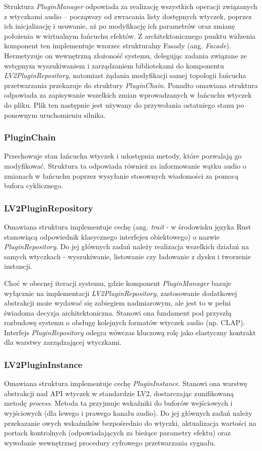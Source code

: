 \documentclass[12pt,a4paper]{report}
\begin{document}
Struktura \textit{PluginManager} odpowiada za realizację wszystkich
operacji związanych z wtyczkami audio – począwszy od zwracania listy
dostępnych wtyczek, poprzez ich inicjalizację i usuwanie, aż po
modyfikację ich parametrów oraz zmianę położenia w wirtualnym
łańcuchu efektów. Z architektonicznego punktu widzenia komponent ten
implementuje wzorzec strukturalny Fasady (ang. \textit{Facade}).
Hermetyzuje on wewnętrzną złożoność systemu, delegując zadania
związane ze wstępnym wyszukiwaniem i zarządzaniem bibliotekami do
komponentu \textit{LV2PluginRepository}, natomiast żądania
modyfikacji samej topologii łańcucha przetwarzania przekazuje do
struktury \textit{PluginChain}. Ponadto omawiana struktura odpowiada
za zapisywanie wszelkich zmian wprowadzanych w łańcuchu wtyczek do
pliku. Plik ten następnie jest używany do przywołania ostatniego
stanu po ponownym uruchomieniu silnika.

\subsubsection{PluginChain}
Przechowuje stan łańcucha wtyczek i udostępnia metody, które
pozwalają go modyfikować. Struktura ta odpowiada również za
informowanie wątku audio o zmianach w łańcuchu poprzez wysyłanie
stosownych wiadomości za pomocą bufora cyklicznego.

\subsubsection{LV2PluginRepository}
Omawiana struktura implementuje cechę (ang. \textit{trait} - w
  środowisku języka Rust stanowiącą odpowiednik klasycznego interfejsu
obiektowego) o nazwie \textit{PluginRepository}. Do jej głównych
zadań należy realizacja wszelkich działań na samych wtyczkach -
wyszukiwanie, listowanie czy ładowanie z dysku i tworzenie instancji.

Choć w obecnej iteracji systemu, gdzie komponent
\textit{PluginManager} bazuje wyłącznie na implementacji
\textit{LV2PluginRepository}, zastosowanie dodatkowej abstrakcji może
wydawać się zabiegiem nadmiarowym, ale jest to w pełni świadoma
decyzja architektoniczna. Stanowi ona fundament pod przyszłą
rozbudowę systemu o obsługę kolejnych formatów wtyczek audio (np.
CLAP). Interfejs \textit{PluginRepository} odegra wówczas kluczową
rolę jako elastyczny kontrakt dla warstwy zarządzającej wtyczkami.

\subsubsection{LV2PluginInstance}
Omawiana struktura implementuje cechę \textit{PluginInstance}.
Stanowi ona warstwę abstrakcji nad API wtyczek w standardzie LV2,
dostarczając zunifikowaną metodę \textit{process}. Metoda ta
przyjmuje wskaźniki do buforów wejściowych i wyjściowych (dla lewego
i prawego kanału audio). Do jej głównych zadań należy przekazanie
owych wskaźników bezpośrednio do wtyczki, aktualizacja wartości na
portach kontrolnych (odpowiadających za bieżące parametry efektu)
oraz wywołanie wewnętrznej procedury cyfrowego przetwarzania sygnału.
\end{document}
